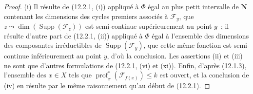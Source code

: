 \begin{proof}
(i) Il résulte de (12.2.1, (i)) appliqué à $\Phi$ égal au plus petit intervalle de
$\mathbf N$ contenant les dimensions des cycles premiers associés à
$\mathcal F_y$, que $z\leadsto\dim(\operatorname{Supp}(\mathcal F_z))$ est
semi-continue supérieurement au point $y$~; il résulte d'autre part de
(12.2.1, (ii)) appliqué à $\Phi$ égal à l'ensemble des dimensions des
composantes irréductibles de $\operatorname{Supp}(\mathcal F_y)$, que cette
même fonction est semi-continue inférieurement au point $y$, d'où la
conclusion. Les assertions (ii) et (iii) ne sont que d'autres formulations de
(12.2.1, (vi) et (xi)). Enfin, d'après (12.1.3), l'ensemble des $x\in X$ tels
que $\operatorname{prof}^{*}_x(\mathcal F_{f(x)})\leq k$ est ouvert, et la
conclusion de (iv) en résulte par le même raisonnement qu'au début de (12.2.1).
\end{proof}

